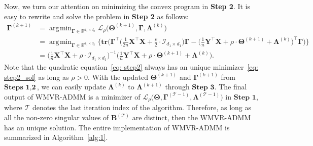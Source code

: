 \documentclass[alpha-refs]{wiley-article}
\DeclareMathOperator*{\argmin}{\arg\!\min}
\begin{document}
Now, we turn our attention on minimizing the convex program in \textbf{Step 2}.
It is easy to rewrite and solve the problem in \textbf{Step 2} as follows: 
\begin{align}
    \boldsymbol{\Gamma}^{(k+1)} 
    &= \argmin_{\boldsymbol{\Gamma}\in\mathbb{R}^{d_{1} \times d_{2}}} \mathcal{L}_{\rho} \big( \boldsymbol{\Theta}^{(k+1)},\boldsymbol{\Gamma},\boldsymbol{\Lambda}^{(k)} \big) \nonumber \\
    &= \argmin_{\boldsymbol{\Gamma}\in\mathbb{R}^{d_{1} \times d_{2}}} \bigg\{ \textbf{tr} \bigg( \boldsymbol{\Gamma}^{\top}\bigg(\frac{1}{2n}\boldsymbol{X}^{\top}\boldsymbol{X} + \frac{\rho}{2} \cdot \mathcal{I}_{d_{1} \times d_{1}} \bigg) \boldsymbol{\Gamma} - \bigg( \frac{1}{n}\boldsymbol{Y}^{\top}\boldsymbol{X} + \rho \cdot \boldsymbol{\Theta}^{(k+1)} + \boldsymbol{\Lambda}^{(k)} \bigg)^{\top} \boldsymbol{\Gamma} \bigg) \bigg\} \label{eq: step2} \\ 
    &= \bigg( \frac{1}{n}\boldsymbol{X}^{\top}\boldsymbol{X}+\rho\cdot\mathcal{I}_{d_{1} \times d_{1}} \bigg)^{-1}\bigg( \frac{1}{n}\boldsymbol{Y}^{\top}\boldsymbol{X} +\rho \cdot \boldsymbol{\Theta}^{(k+1)} + \boldsymbol{\Lambda}^{(k)} \bigg). \label{eq: step2_sol} 
\end{align}
Note that the quadratic equation~\eqref{eq: step2} always has an unique minimizer~\eqref{eq: step2_sol} as long as $\rho>0$.
With the updated $\boldsymbol{\Theta}^{(k+1)}$ and $\boldsymbol{\Gamma}^{(k+1)}$ from $\textbf{Steps 1}, \textbf{2}$, we can easily update $\boldsymbol{\Lambda}^{(k)}$ to $\boldsymbol{\Lambda}^{(k+1)}$ through $\textbf{Step 3}$.
The final output of WMVR-ADMM is a minimizer of $\mathcal{L}_{\rho} \big( \boldsymbol{\Theta},\boldsymbol{\Gamma}^{(\mathcal{T}-1)},\boldsymbol{\Lambda}^{(\mathcal{T}-1)}\big)$ in $\textbf{Step 1}$, where $\mathcal{T}$ denotes the last iteration index of the algorithm.
Therefore, as long as all the non-zero singular values of $\boldsymbol{B}^{(\mathcal{T})}$ are distinct, then the WMVR-ADMM has an unique solution.
The entire implementation of WMVR-ADMM is summarized in Algorithm~\ref{alg:1}.
\end{document}
